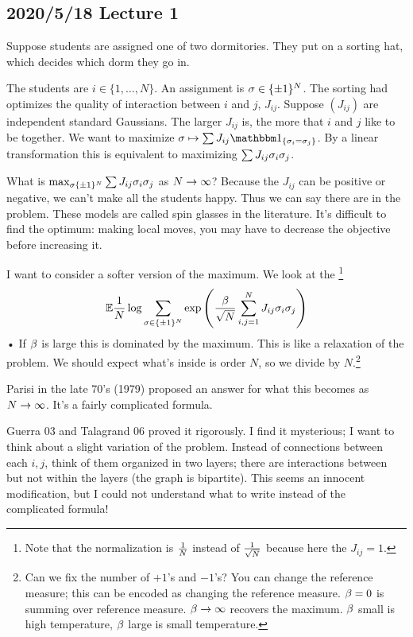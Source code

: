 \subsection*{2020/5/18 Lecture 1}

Suppose students are assigned one of two dormitories. They put on a sorting hat, which decides which dorm they go in.

The students are $i\in \{1,\ldots, N\}$. An assignment is $\sigma\in \{\pm 1\}^N$. 
The sorting had optimizes the quality of interaction between $i$ and $j$, $J_{ij}$. Suppose $(J_{ij})$ are independent standard Gaussians. The larger $J_{ij}$ is, the more that $i$ and $j$ like to be together. We want to maximize $\si\mapsto \sum J_{ij} \one_{\{\si_i=\si_j\}}$. By a linear transformation this is equivalent to maximizing $\sum J_{ij} \sigma_i\sigma_j$.

What is $\max_{\sigma\{\pm 1\}^N} \sum J_{ij}\sigma_i\sigma_j$ as $N\to \infty$?
Because the $J_{ij}$ can be positive or negative, we can't make all the students happy. Thus we can say there are  in the problem. These models are called spin glasses in the literature.
It's difficult to find the optimum: making local moves, you may have to decrease the objective before increasing it.

I want to consider a softer version of the maximum. We look at the \footnote{Note that the normalization is $\frac{1}{N}$ instead of $\frac{1}{\sqrt N}$ because here the $J_{ij}=1$.}
\begin{align*}
\mathbb{E} \frac{1}{N}\log \sum_{\sigma\in \{\pm 1\}^N}\exp\left( {
\frac{\beta}{\sqrt N}\sum_{i,j=1}^{N} J_{ij} \sigma_i\sigma_j
} \right)
\end{align*}•
If $\beta$ is large this is dominated by the maximum. 
This is like a relaxation of the problem. We should expect what's inside is order $N$, so we divide by $N$.\footnote{Can we fix the number of $+1$'s and $-1$'s? You can change the reference measure; this can be encoded as changing the reference measure.
$\beta=0$ is summing over reference measure. $\beta\to \infty$ recovers the maximum. $\beta$ small is high temperature, $\beta$ large is small temperature.}

Parisi in the late 70's (1979) proposed an answer for what this becomes as $N\to \infty$. It's a fairly complicated formula. 

Guerra 03 and Talagrand 06 proved it rigorously. I find it mysterious; I want to think about a slight variation of the problem. Instead of connections between each $i,j$, think of them organized in two layers; there are interactions between but not within the layers (the graph is bipartite). 
This seems an innocent modification, but I could not understand what to write instead of the complicated formula! %

